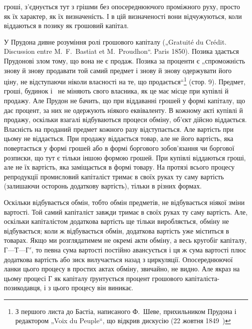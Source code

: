 \parcont{}  %
гроші, з’єднується тут з грішми без опосереднюючого проміжного
руху, просто як їх характер, як їх визначеність. І в цій
визначеності вони відчужуються, коли віддаються в позику як
грошовий капітал.

У Прудона дивне розуміння ролі грошового капіталу („Gratuité
du Crédit. Discussion entre M.~F.~Bastiat et M.~Proudhon“.
Paris 1850). Позика здається Прудонові злом тому, що вона не
є продаж. Позика за проценти є „спроможність знову й знову продавати
той самий предмет і знову й знову одержувати його ціну,
не відступаючи ніколи власності на те, що продається“\footnote*{
З першого листа до Бастіа, написаного Ф.~Шеве, прихильником Прудона
і редактором „Voix du Peuple“, що відкрив дискусію (22 жовтня 1849~) 
} (стор. 9).
Предмет, гроші, будинок і~ не міняють свого власника, як
це має місце при купівлі й продажу. Але Прудон не бачить,
що при віддаванні грошей у формі капіталу, що дає процент, за
них не одержують ніякого еквіваленту. В кожному акті купівлі
й продажу, оскільки взагалі відбуваються процеси обміну, об’єкт
дійсно віддається. Власність на проданий предмет кожного разу
відступається. Але вартість при цьому не віддається. При продажу
віддається товар, але не його вартість, яка повертається
у формі грошей або в формі боргового зобов’язання чи боргової
розписки, що тут є тільки іншою формою грошей. При купівлі віддаються
гроші, але не їх вартість, яка заміщається в формі товару.
На протязі всього процесу репродукції промисловий капіталіст
тримає в своїх руках ту саму вартість (залишаючи
осторонь додаткову вартість), тільки в різних формах.

Оскільки відбувається обмін, тобто обмін предметів, не відбувається
ніякої зміни вартості. Той самий капіталіст завжди
тримає в своїх руках ту саму вартість. Але, оскільки капіталістом
додаткова вартість ще тільки виробляється, обміну не відбувається;
коли ж відбувається обмін, додаткова вартість уже
міститься в товарах. Якщо ми розглядатимем не окремі акти
обміну, а весь кругобіг капіталу, $Г — Т — Г'$, то певна сума вартості
постійно авансується і ця ж сума вартості плюс додаткова вартість
або зиск вилучається назад з циркуляції. Опосереднюючої
ланки цього процесу в простих актах обміну, звичайно, не видно.
Але якраз на цьому процесі $Г$ як капіталу ґрунтується процент
грошового капіталіста-позикодавця, і з цього процесу він
виникає.

